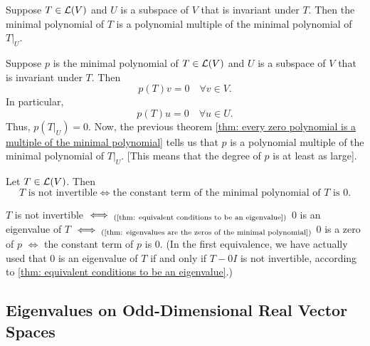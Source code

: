 \setcounter{thm}{30}
\begin{thm}
  \label{thm: minimal polynomial of a restriction operator}
  Suppose $T \in \mathcal{L}(V)$ and $U$ is a subspace of $V$ that is invariant under $T$. Then the minimal polynomial of $T$ is a polynomial multiple of the minimal polynomial of $\left .T \right | _{ U}$.
\end{thm}
\begin{prf}
  Suppose $p$ is the minimal polynomial of $T\in \mathcal{L}(V)$ and $U$ is a subspace of $V$ that is invariant under $T$. Then
  \begin{equation}
    p(T)v=0 \quad \forall v \in V.
  \end{equation}
  In particular,
  \begin{equation}
    p(T)u=0 \quad \forall u\in U.
  \end{equation} Thus, $p\left( \left.T\right|_{U} \right)=0.$ Now, the previous theorem
  \ref{thm: every zero polynomial is a multiple of the minimal polynomial} tells us that $p$ is a polynomial multiple of the minimal polynomial of $\left. T \right |_U$. [This means that the degree of $p$ is at least as large].
\end{prf}

\begin{thm} 
  Let $T \in \mathcal{L} (V)$. Then
  \begin{equation}
    T \text{ is not invertible} \iff \text{the constant term of the minimal polynomial of } T \text{ is } 0.
  \end{equation}
\end{thm}
\begin{prf}
  $T$ is not invertible $\iff_{\text{(\ref{thm: equivalent conditions to be an eigenvalue})}}$ $0$ is an eigenvalue of $T$ $\iff_{(\text{\ref{thm: eigenvalues are the zeros of the minimal polynomial})}}$ $0$ is a zero of $p$ $\iff$ the constant term of $p$ is $0$.
  (In the first equivalence, we have actually used that $0$ is an eigenvalue of $T$ if and only if $T-0I$ is not invertible, according to \ref{thm: equivalent conditions to be an eigenvalue}.)
\end{prf}

\subsection{Eigenvalues on Odd-Dimensional Real Vector Spaces}

